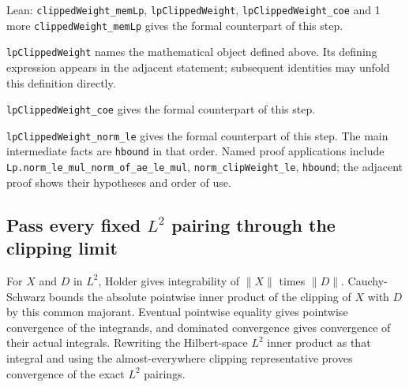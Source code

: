 \documentclass[11pt,a4paper]{report}
\begin{document}
\begin{leanbox}{Lean: \texttt{clippedWeight\_\allowbreak{}memLp}, \texttt{lpClippedWeight}, \texttt{lpClippedWeight\_\allowbreak{}coe} and 1 more}
\texttt{clipped\allowbreak{}Weight\_\allowbreak{}mem\allowbreak{}Lp} gives the formal counterpart of this step.




\texttt{lp\allowbreak{}Clipped\allowbreak{}Weight} names the mathematical object defined above. Its defining expression appears in the adjacent statement; subsequent identities may unfold this definition directly.




\texttt{lp\allowbreak{}Clipped\allowbreak{}Weight\_\allowbreak{}coe} gives the formal counterpart of this step.




\texttt{lp\allowbreak{}Clipped\allowbreak{}Weight\_\allowbreak{}norm\_\allowbreak{}le} gives the formal counterpart of this step. The main intermediate facts are \texttt{hbound} in that order. Named proof applications include \texttt{Lp.\allowbreak{}norm\_\allowbreak{}le\_\allowbreak{}mul\_\allowbreak{}norm\_\allowbreak{}of\_\allowbreak{}ae\_\allowbreak{}le\_\allowbreak{}mul}, \texttt{norm\_\allowbreak{}clip\allowbreak{}Weight\_\allowbreak{}le}, \texttt{hbound}; the adjacent proof shows their hypotheses and order of use.
\end{leanbox}
\subsection{\texorpdfstring{Pass every fixed \(L^{2}\) pairing through the clipping limit}{Pass every fixed L² pairing through the clipping limit}}
\label{report-step-AverageLMC-LaplacianWeightClipping-lean-4}


For \(X\) and \(D\) in \(L^{2}\), Holder gives integrability of \(\|X\|\) times \(\|D\|\). Cauchy-Schwarz bounds the absolute pointwise inner product of the clipping of \(X\) with \(D\) by this common majorant. Eventual pointwise equality gives pointwise convergence of the integrands, and dominated convergence gives convergence of their actual integrals. Rewriting the Hilbert-space \(L^{2}\) inner product as that integral and using the almost-everywhere clipping representative proves convergence of the exact \(L^{2}\) pairings.
\end{document}
